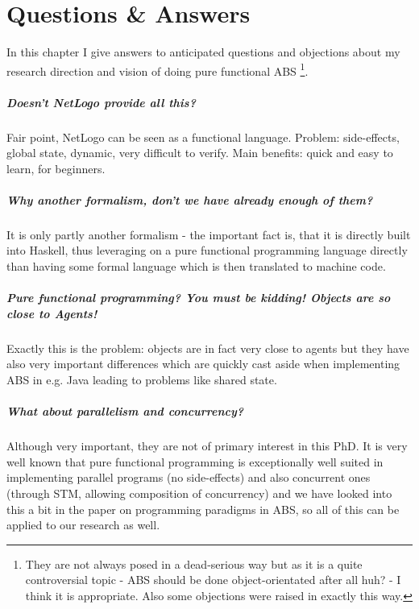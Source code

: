 \chapter{Questions \& Answers}
\label{chap:qa}

In this chapter I give answers to anticipated questions and objections about my research direction and vision of doing pure functional ABS \footnote{They are not always posed in a dead-serious way but as it is a quite controversial topic - ABS should be done object-orientated after all huh? - I think it is appropriate. Also some objections were raised in exactly this way.}.

\paragraph{Doesn't NetLogo provide all this?}
Fair point, NetLogo can be seen as a functional language. Problem: side-effects, global state, dynamic, very difficult to verify. Main benefits: quick and easy to learn, for beginners.

\paragraph{Why another formalism, don't we have already enough of them?}
It is only partly another formalism - the important fact is, that it is directly built into Haskell, thus leveraging on a pure functional programming language directly than having some formal language which is then translated to machine code.

\paragraph{Pure functional programming? You must be kidding! Objects are so close to Agents!}
Exactly this is the problem: objects are in fact very close to agents but they have also very important differences which are quickly cast aside when implementing ABS in e.g. Java leading to problems like shared state.

\paragraph{What about parallelism and concurrency?}
Although very important, they are not of primary interest in this PhD. It is very well known that pure functional programming is exceptionally well suited in implementing parallel programs (no side-effects) and also concurrent ones (through STM, allowing composition of concurrency) and we have looked into this a bit in the paper on programming paradigms in ABS, so all of this can be applied to our research as well.

